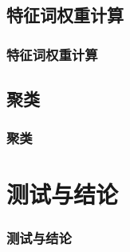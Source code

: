 \documentclass[CJKutf8, table]{beamer}
\begin{document}
\begin{CJK}{UTF8}{gbsn}
\subsection{特征词权重计算}
\begin{frame}
  \frametitle{特征词权重计算}
\end{frame}

\subsection{聚类}
\begin{frame}
  \frametitle{聚类}
\end{frame}

\section{测试与结论}
\begin{frame}
  \frametitle{测试与结论}
\end{frame}
\end{CJK}
\end{document}
